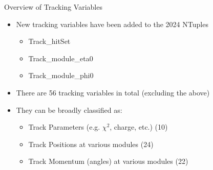 \begin{frame}{Overview of Tracking Variables}
    \begin{itemize}
        \item New tracking variables have been added to the 2024 NTuples
              \begin{itemize}
                  \item Track\_hitSet
                  \item Track\_module\_eta0
                  \item Track\_module\_phi0
              \end{itemize}
        \item There are 56 tracking variables in total (excluding the above)
        \item They can be broadly classified as:
              \begin{itemize}
                \item Track Parameters (e.g. $\chi^2$, charge, etc.) (10)
                  \item Track Positions at various modules (24)
                  \item Track Momentum (angles) at various modules (22)
              \end{itemize}
    \end{itemize}

\end{frame}